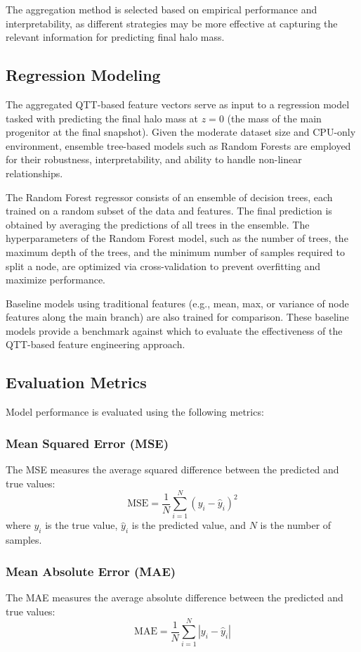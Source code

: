 \documentclass[twocolumn]{aastex631}
\begin{document}
The aggregation method is selected based on empirical performance and interpretability, as different strategies may be more effective at capturing the relevant information for predicting final halo mass.

\subsection{Regression Modeling}

The aggregated QTT-based feature vectors serve as input to a regression model tasked with predicting the final halo mass at \(z=0\) (the mass of the main progenitor at the final snapshot). Given the moderate dataset size and CPU-only environment, ensemble tree-based models such as Random Forests are employed for their robustness, interpretability, and ability to handle non-linear relationships.

The Random Forest regressor consists of an ensemble of decision trees, each trained on a random subset of the data and features. The final prediction is obtained by averaging the predictions of all trees in the ensemble. The hyperparameters of the Random Forest model, such as the number of trees, the maximum depth of the trees, and the minimum number of samples required to split a node, are optimized via cross-validation to prevent overfitting and maximize performance.

Baseline models using traditional features (e.g., mean, max, or variance of node features along the main branch) are also trained for comparison. These baseline models provide a benchmark against which to evaluate the effectiveness of the QTT-based feature engineering approach.

\subsection{Evaluation Metrics}

Model performance is evaluated using the following metrics:

\subsubsection{Mean Squared Error (MSE)}
The MSE measures the average squared difference between the predicted and true values:
\[
\text{MSE} = \frac{1}{N} \sum_{i=1}^{N} (y_i - \hat{y}_i)^2
\]
where \(y_i\) is the true value, \(\hat{y}_i\) is the predicted value, and \(N\) is the number of samples.

\subsubsection{Mean Absolute Error (MAE)}
The MAE measures the average absolute difference between the predicted and true values:
\[
\text{MAE} = \frac{1}{N} \sum_{i=1}^{N} |y_i - \hat{y}_i|
\]
\end{document}
